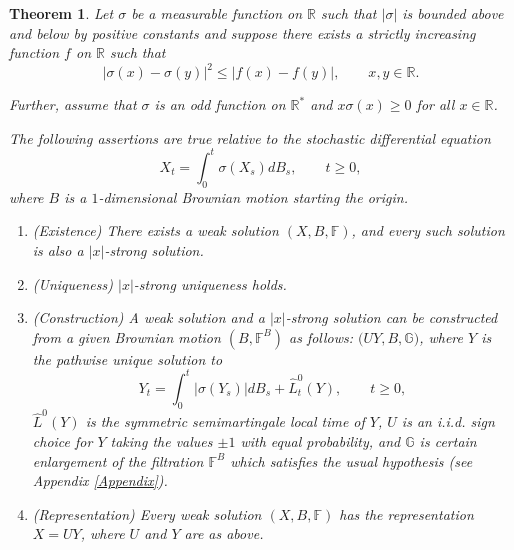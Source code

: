 \documentclass[reqno]{amsart}
\newtheorem{theorem}{Theorem}[section]
\theoremstyle{definition}
\theoremstyle{remark}
\numberwithin{equation}{section}
\begin{document}
\begin{theorem}
\label{theorem 2}Let $\sigma $ be a measurable function on $\mathbb{R}$ such
that $\left\vert \sigma \right\vert $ is bounded above and below by positive
constants and suppose there exists a strictly increasing function $f$ on $\mathbb{R}$ such that\begin{equation}
\left\vert \sigma \left( x\right) -\sigma \left( y\right) \right\vert
^{2}\leq \left\vert f\left( x\right) -f\left( y\right) \right\vert ,\qquad
x,y\in \mathbb{R}.  \label{condition on sigma}
\end{equation}

Further, assume that $\sigma $ is an odd function on $\mathbb{R}^{\ast }$
and $x\sigma \left( x\right) \geq 0$ for all $x\in \mathbb{R}$.

The following assertions are true relative to the stochastic differential equation
\begin{equation}\label{SDE3}
X_{t}=\int_{0}^{t}\sigma \left( X_{s}\right) dB_{s},\qquad t\geq 0,
\end{equation}
where $B$ is a $1$-dimensional Brownian motion starting the origin.
\begin{enumerate}
\item (Existence) There exists a weak solution $(X,B,\mathbb{F})$, and every such solution is also a $\vert x\vert$-strong solution.

\item (Uniqueness) $\vert x\vert$-strong uniqueness holds.

\item (Construction) A weak solution and a $\vert x \vert $-strong solution can be constructed from a given Brownian motion $(B,\mathbb{F}^B)$ as follows: $\big(  U Y,B,\mathbb{G}\big) $, where $Y$ is the pathwise unique solution to
\begin{equation}\label{equation for Y}
Y_{t}=\int_{0}^{t}\left\vert \sigma \left( Y_{s}\right) \right\vert
dB_{s}+\widehat{L}_{t}^{0}\left( Y\right) ,\qquad t\geq 0,
\end{equation}
$\widehat{L}^{0}\left( Y\right)$ is the symmetric semimartingale local time of $Y$, $U$ is an i.i.d. sign choice for $Y$ taking the values $\pm1$ with equal probability, and $\mathbb{G}$ is certain enlargement of the filtration $\mathbb{F}^B$ which satisfies the usual hypothesis (see Appendix \ref{Appendix}).

\item (Representation) Every weak solution $(X,B,\mathbb{F})$ has the representation $X=U Y$, where $U$ and $Y$ are as above.
\end{enumerate}
\end{theorem}
\end{document}
